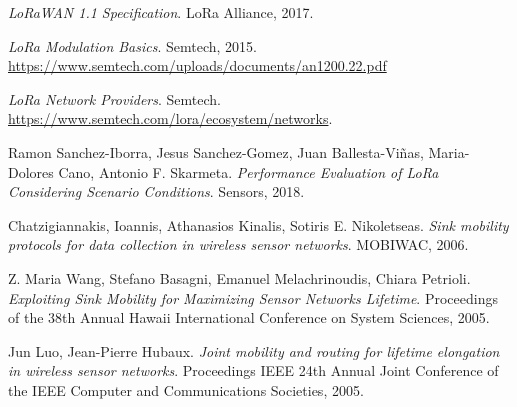 \documentclass[a4paper,11pt]{article}
\theoremstyle{definition}
\begin{document}
\begin{thebibliography}{0}

\textit{LoRaWAN 1.1 Specification}.
LoRa Alliance, 2017.

\textit{LoRa Modulation Basics}.
Semtech, 2015.
\url{https://www.semtech.com/uploads/documents/an1200.22.pdf}

\textit{LoRa Network Providers}.
Semtech.
\url{https://www.semtech.com/lora/ecosystem/networks}.

Ramon Sanchez-Iborra, Jesus Sanchez-Gomez, Juan Ballesta-Viñas, Maria-Dolores Cano, Antonio F. Skarmeta.
\textit{Performance Evaluation of LoRa Considering Scenario Conditions}. 
Sensors, 2018.

Chatzigiannakis, Ioannis, Athanasios Kinalis, Sotiris E. Nikoletseas.
\textit{Sink mobility protocols for data collection in wireless sensor networks}.
MOBIWAC, 2006.

Z. Maria Wang, Stefano Basagni, Emanuel Melachrinoudis, Chiara Petrioli.
\textit{Exploiting Sink Mobility for Maximizing Sensor Networks Lifetime}.
Proceedings of the 38th Annual Hawaii International Conference on System Sciences, 2005.

Jun Luo, Jean-Pierre Hubaux.
\textit{Joint mobility and routing for lifetime elongation in wireless sensor networks}.
Proceedings IEEE 24th Annual Joint Conference of the IEEE Computer and Communications Societies, 2005.

\end{thebibliography}
\end{document}
